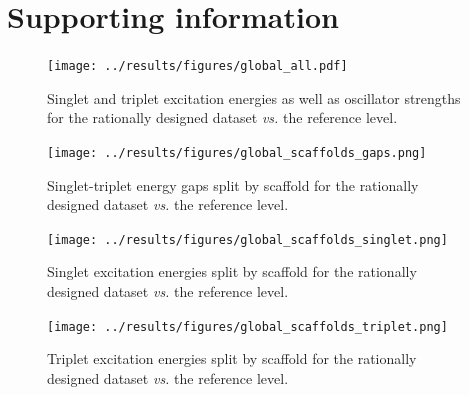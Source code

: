 \documentclass[
  number,
  3p]{elsarticle}
\begin{document}
\newpage
\setcounter{page}{1}
\setcounter{section}{0}
\setcounter{figure}{0}
\setcounter{table}{0}
\renewcommand{\thepage}{S\arabic{page}}
\renewcommand{\thesection}{S\arabic{section}}
\renewcommand{\thetable}{S\arabic{table}}
\renewcommand{\thefigure}{S\arabic{figure}}

\hypertarget{supporting-information}{%
\section{Supporting information}\label{supporting-information}}

\begin{figure}

{\centering \texttt{[image: ../results/figures/global\_all.pdf]}

}

\caption{\label{fig-global-all}Singlet and triplet excitation energies
as well as oscillator strengths for the rationally designed dataset
\emph{vs.} the reference level.}

\end{figure}

\begin{figure}

{\centering \texttt{[image: ../results/figures/global\_scaffolds\_gaps.png]}

}

\caption{\label{fig-global-scaffolds-gaps}Singlet-triplet energy gaps
split by scaffold for the rationally designed dataset \emph{vs.} the
reference level.}

\end{figure}

\begin{figure}

{\centering \texttt{[image: ../results/figures/global\_scaffolds\_singlet.png]}

}

\caption{\label{fig-global-scaffolds-singlet}Singlet excitation energies
split by scaffold for the rationally designed dataset \emph{vs.} the
reference level.}

\end{figure}

\begin{figure}

{\centering \texttt{[image: ../results/figures/global\_scaffolds\_triplet.png]}

}

\caption{\label{fig-global-scaffolds-triplet}Triplet excitation energies
split by scaffold for the rationally designed dataset \emph{vs.} the
reference level.}

\end{figure}
\end{document}
